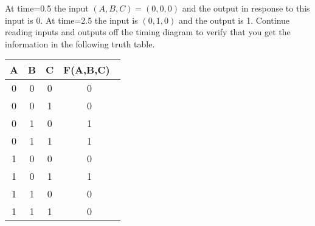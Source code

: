 At time=0.5 the input $(A,B,C)=(0,0,0)$ and the output in response to this input is 0.
At time=2.5 the input is $(0,1,0)$ and the output is 1.
Continue reading inputs and outputs off the timing diagram to verify
that you get the information in the following truth table.

\begin{tabular}{c|c|c||c}
A & B & C & F(A,B,C)\ \\ \hline
0 & 0 & 0  & 0  \\ \hline
0 & 0 & 1  & 0  \\ \hline
0 & 1 & 0  & 1  \\ \hline
0 & 1 & 1  & 1  \\ \hline
1 & 0 & 0  & 0  \\ \hline
1 & 0 & 1  & 1  \\ \hline
1 & 1 & 0  & 0  \\ \hline
1 & 1 & 1  & 0  \\
\end{tabular}

